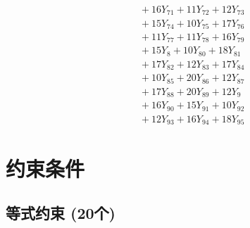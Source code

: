 \documentclass[a4paper,10pt]{article}
\begin{document}
{\begin{align}
&\quad  + 16Y_{71} + 11Y_{72} + 12Y_{73} \\[0.5ex]
&\quad  + 15Y_{74} + 10Y_{75} + 17Y_{76} \\[0.5ex]
&\quad  + 11Y_{77} + 11Y_{78} + 16Y_{79} \\[0.5ex]
&\quad  + 15Y_{8} + 10Y_{80} + 18Y_{81} \\[0.5ex]
&\quad  + 17Y_{82} + 12Y_{83} + 17Y_{84} \\[0.5ex]
&\quad  + 10Y_{85} + 20Y_{86} + 12Y_{87} \\[0.5ex]
&\quad  + 17Y_{88} + 20Y_{89} + 12Y_{9} \\[0.5ex]
&\quad  + 16Y_{90} + 15Y_{91} + 10Y_{92} \\[0.5ex]
&\quad  + 12Y_{93} + 16Y_{94} + 18Y_{95}\nonumber
\end{align}
}

\section{约束条件}

\subsection{等式约束 (20个)}
\end{document}
